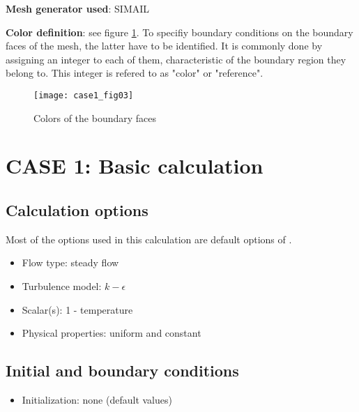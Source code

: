{\bfseries Mesh generator used}: SIMAIL

{\bfseries Color definition}: see figure \ref{figante13}. To specifiy boundary
conditions on the boundary faces of the mesh, the latter have to be
identified. It is commonly done by assigning an integer to each of them,
characteristic of the boundary region they belong to. This integer is refered to
as "color" or "reference".

\begin{figure}[ht]
\begin{center}
\texttt{[image: case1\_fig03]}
\caption{Colors of the boundary faces}
\label{figante13}
\end{center}
\end{figure}


\section{CASE 1: Basic calculation}

        \subsection{Calculation options}

Most of the options used in this calculation are default options of \CS.
\begin{itemize}
\renewcommand{\labelitemi}{$\rightarrow$}
        \item Flow type: steady flow
        \item Turbulence model: $k-\epsilon$
        \item Scalar(s): 1 - temperature
        \item Physical properties: uniform and constant
\end{itemize}


        \subsection{Initial and boundary conditions}

\begin{itemize}
\renewcommand{\labelitemi}{$\rightarrow$}
        \item Initialization: none (default values)
\end{itemize}


